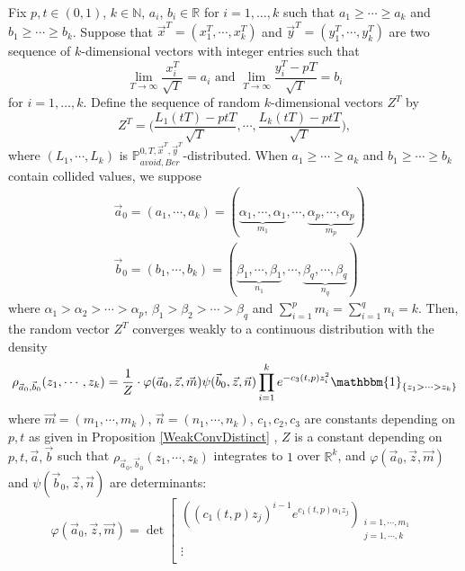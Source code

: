 \begin{lemma}\label{prob17}
Fix $p,t\in(0,1)$, $k\in\mathbb{N}$, $a_{i}$, $b_{i}\in\mathbb{R}$ for $i=1,\dots,k$ such that $a_{1}\geq \cdots \geq a_{k}$ and $b_{1}\geq \cdots \geq b_{k}$. Suppose that $\vec{x}^{T}=(x_{1}^{T},\cdots,x_{k}^{T})$ and $\vec{y}^{T}=(y_{1}^{T},\cdots,y_{k}^{T})$ are two sequence of $k$-dimensional vectors with integer entries such that $$\lim_{T\rightarrow\infty}\frac{x_{i}^{T}}{\sqrt{T}}=a_{i} \text{ and } \lim_{T\rightarrow\infty}\frac{y_{i}^{T}-pT}{\sqrt{T}}=b_{i}$$ for $i=1,\dots,k$. Define the sequence of random $k$-dimensional vectors $Z^{T}$ by $$Z^{T}=\big(\frac{L_{1}(tT)-ptT}{\sqrt{T}},\cdots,\frac{L_{k}(tT)-ptT}{\sqrt{T}}\big),$$ where $(L_{1},\cdots,L_{k})$ is $\mathbb{P}^{0,T,\vec{x}^{T},\vec{y}^{T}}_{avoid,Ber}$-distributed. When $a_{1}\geq \cdots \geq a_{k}$ and $b_{1}\geq \cdots \geq b_{k}$ contain collided values, we suppose
\begin{align*}
&\vec{a}_{0}=(a_{1},\cdots,a_{k})=(\underbrace{\alpha_{1},\cdots,\alpha_{1}}_{m_{1}},\cdots,\underbrace{\alpha_{p},\cdots,\alpha_{p}}_{m_{p}})\\
&\vec{b}_{0}=(b_{1},\cdots,b_{k})=(\underbrace{\beta_{1},\cdots,\beta_{1}}_{n_{1}},\cdots,\underbrace{\beta_{q},\cdots,\beta_{q}}_{n_{q}})
\end{align*}
where $\alpha_{1}>\alpha_{2}>\cdots>\alpha_{p}$, $\beta_{1}>\beta_{2}>\cdots>\beta_{q}$ and $\sum_{i=1}^{p}m_{i}=\sum_{i=1}^{q}n_{i}=k$. Then, the random vector $Z^{T}$ converges weakly to a continuous distribution with the density $$\rho_{\vec{a}_{0},\vec{b}_{0}}(z_{1},\cdots,z_{k})=\frac{1}{Z}\cdot \varphi(\vec{a}_{0},\vec{z},\vec{m})\psi(\vec{b}_{0},\vec{z},\vec{n})\prod_{i=1}^{k}e^{-c_{3}(t,p)z_{i}^{2}}\mathbbm{1}_{\{z_{1}>\cdots> z_{k}\}}$$ where $\vec{m}=(m_{1},\cdots,m_{k})$, $\vec{n}=(n_{1},\cdots,n_{k})$, $c_{1},c_{2},c_{3}$ are constants depending on $p,t$ as given in Proposition \ref{WeakConvDistinct} , $Z$ is a constant depending on $p,t,\vec{a},\vec{b}$ such that $\rho_{\vec{a}_{0},\vec{b}_{0}}(z_{1},\cdots,z_{k})$ integrates to $1$ over $\mathbb{R}^{k}$, and $\varphi(\vec{a}_{0},\vec{z},\vec{m})$ and $\psi(\vec{b}_{0},\vec{z},\vec{n})$ are determinants:
\begin{equation*}
\varphi(\vec{a}_{0},\vec{z},\vec{m})= \det
\left[ \begin{array}{ccc}
((c_{1}(t,p)z_{j})^{i-1}e^{c_{1}(t,p)\alpha_{1}z_{j}})_{\substack{i=1,\cdots,m_{1}\\j=1,\cdots,k}}\\
\vdots\\

\end{array}
\end{equation*}
\end{lemma}
